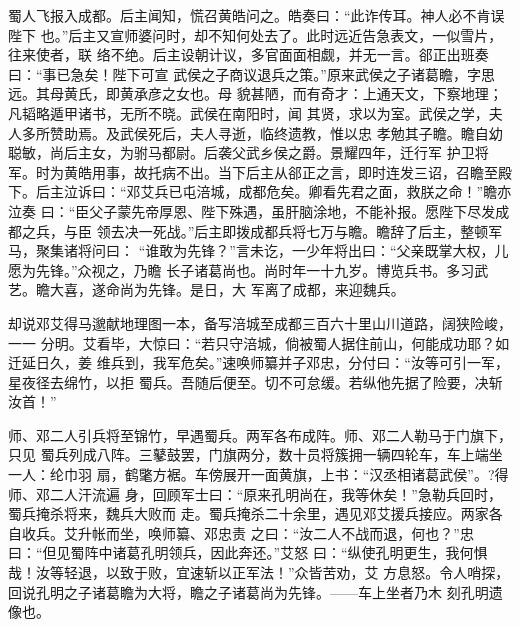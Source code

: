 蜀人飞报入成都。后主闻知，慌召黄皓问之。皓奏曰：“此诈传耳。神人必不肯误陛下
也。”后主又宣师婆问时，却不知何处去了。此时远近告急表文，一似雪片，往来使者，联
络不绝。后主设朝计议，多官面面相觑，并无一言。郤正出班奏曰：“事已急矣！陛下可宣
武侯之子商议退兵之策。”原来武侯之子诸葛瞻，字思远。其母黄氏，即黄承彦之女也。母
貌甚陋，而有奇才：上通天文，下察地理；凡韬略遁甲诸书，无所不晓。武侯在南阳时，闻
其贤，求以为室。武侯之学，夫人多所赞助焉。及武侯死后，夫人寻逝，临终遗教，惟以忠
孝勉其子瞻。瞻自幼聪敏，尚后主女，为驸马都尉。后袭父武乡侯之爵。景耀四年，迁行军
护卫将军。时为黄皓用事，故托病不出。当下后主从郤正之言，即时连发三诏，召瞻至殿
下。后主泣诉曰：“邓艾兵已屯涪城，成都危矣。卿看先君之面，救朕之命！”瞻亦泣奏
曰：“臣父子蒙先帝厚恩、陛下殊遇，虽肝脑涂地，不能补报。愿陛下尽发成都之兵，与臣
领去决一死战。”后主即拨成都兵将七万与瞻。瞻辞了后主，整顿军马，聚集诸将问曰：
“谁敢为先锋？”言未讫，一少年将出曰：“父亲既掌大权，儿愿为先锋。”众视之，乃瞻
长子诸葛尚也。尚时年一十九岁。博览兵书。多习武艺。瞻大喜，遂命尚为先锋。是日，大
军离了成都，来迎魏兵。

却说邓艾得马邈献地理图一本，备写涪城至成都三百六十里山川道路，阔狭险峻，一一
分明。艾看毕，大惊曰：“若只守涪城，倘被蜀人据住前山，何能成功耶？如迁延日久，姜
维兵到，我军危矣。”速唤师纂并子邓忠，分付曰：“汝等可引一军，星夜径去绵竹，以拒
蜀兵。吾随后便至。切不可怠缓。若纵他先据了险要，决斩汝首！”

师、邓二人引兵将至锦竹，早遇蜀兵。两军各布成阵。师、邓二人勒马于门旗下，只见
蜀兵列成八阵。三鼕鼓罢，门旗两分，数十员将簇拥一辆四轮车，车上端坐一人：纶巾羽
扇，鹤氅方裾。车傍展开一面黄旗，上书：“汉丞相诸葛武侯”。?得师、邓二人汗流遍
身，回顾军士曰：“原来孔明尚在，我等休矣！”急勒兵回时，蜀兵掩杀将来，魏兵大败而
走。蜀兵掩杀二十余里，遇见邓艾援兵接应。两家各自收兵。艾升帐而坐，唤师纂、邓忠责
之曰：“汝二人不战而退，何也？”忠曰：“但见蜀阵中诸葛孔明领兵，因此奔还。”艾怒
曰：“纵使孔明更生，我何惧哉！汝等轻退，以致于败，宜速斩以正军法！”众皆苦劝，艾
方息怒。令人哨探，回说孔明之子诸葛瞻为大将，瞻之子诸葛尚为先锋。——车上坐者乃木
刻孔明遗像也。

